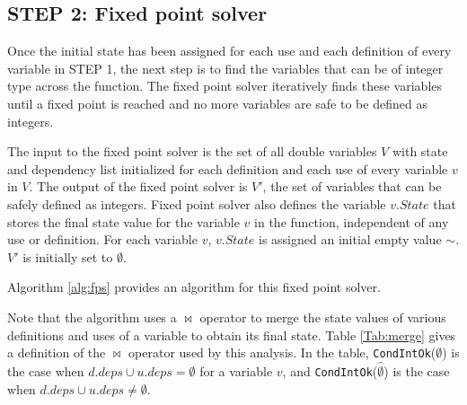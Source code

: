 \subsection{STEP 2: Fixed point solver}

Once the initial state has been assigned for each use and each definition of
every variable in STEP 1, the next step is to find the variables that can be
of integer type across the function. The fixed point solver iteratively finds
these variables until a fixed point is reached and no more variables are safe
to be defined as integers.

The input to the fixed point solver is the set of all double variables $V$ with
state and dependency list initialized for each definition and each use of every
variable $v$ in $V$.
The output of the fixed point solver is $V'$, the set of variables that
can be safely defined as integers. Fixed point solver also defines the variable
$v.State$ that stores the final state value for the variable $v$ in the
function, independent of any use or definition. For each variable $v$,
$v.State$ is assigned an initial empty value $\sim$. $V'$ is initially
set to $\emptyset$.

Algorithm \ref{alg:fps} provides an algorithm for this fixed point solver.


Note that the algorithm uses a $\bowtie$ operator to merge the state values of
various definitions and uses of a variable to obtain its final state. Table
\ref{Tab:merge} gives a definition of the $\bowtie$ operator used by this
analysis. In the table, \texttt{CondIntOk}($\emptyset$) is the case when
$d.deps \cup u.deps = \emptyset$ for a variable $v$, and \texttt{CondIntOk}($\hat\emptyset$) 
is the case when $d.deps \cup u.deps \ne \emptyset$.
\begin{table}[b]
\centering
{}
\caption{Definition of the $\bowtie$ merge operator}
\label{Tab:merge}
\end{table}

